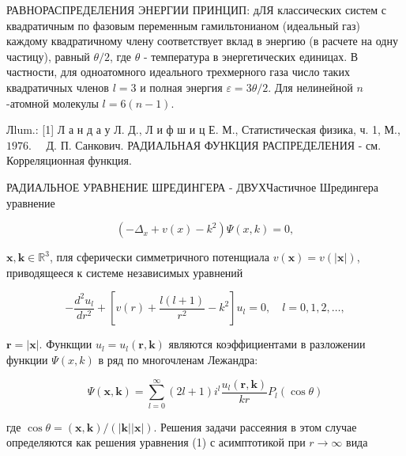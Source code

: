 \documentclass[10pt]{article}
\begin{document}
РАВНОРАСПРЕДЕЛЕНИЯ ЭНЕРГИИ ПРИНЦИП: дЛЯ классических систем с квадратичным по фазовым переменным гамильтонианом (идеальный газ) каждому квадратичному члену соответствует вклад в энергию (в расчете на одну частицу), равный $\theta / 2$, где $\theta$ - температура в энергетических единицах. В частности, для одноатомного идеального трехмерного газа число таких квадратичных членов $l=3$ и полная энергия $\varepsilon=3 \theta / 2$. Для нелинейной $n$-атомной молекулы $l=6(n-1)$.



Лlum.: [1] Л а н д а у Л. Д., Л и ф ш и ц Е. М., Статистическая физика, ч. 1, М., $1976 . \quad$ Д. П. Санкович. РАДИАЛЬНАЯ ФУНКЦИЯ РАСПРЕДЕЛЕНИЯ - см. Корреляционная функция.



РАДИАЛЬНОЕ УРАВНЕНИЕ ШРЕДИНГЕРА - ДВУХЧастичное Шредингера уравнение



\[

\left(-\Delta_{x}+v(x)-k^{2}\right) \Psi(x, k)=0,

\]



$\boldsymbol{x}, \boldsymbol{k} \in \mathbb{R}^{3}$, пля сферически симметричного потенщиала $v(\boldsymbol{x})=v(|\boldsymbol{x}|)$, приводящееся к системе независимых уравнений



\[

-\frac{d^{2} u_{l}}{d r^{2}}+\left[v(r)+\frac{l(l+1)}{r^{2}}-k^{2}\right] u_{l}=0, \quad l=0,1,2, \ldots,

\]



$\boldsymbol{r}=|\boldsymbol{x}|$. Функщии $u_{l}=u_{l}(\boldsymbol{r}, \boldsymbol{k})$ являются коэффициентами в разложении функции $\Psi(x, k)$ в ряд по многочленам Лежандра:



\[

\Psi(\boldsymbol{x}, \boldsymbol{k})=\sum_{l=0}^{\infty}(2 l+1) i^{l} \frac{u_{l}(\boldsymbol{r}, \boldsymbol{k})}{k r} P_{l}(\cos \theta)

\]



где $\cos \theta=(\boldsymbol{x}, \boldsymbol{k}) /(|\boldsymbol{k}||\boldsymbol{x}|)$. Решения задачи рассеяния в этом случае определяются как решения уравнения (1) с асимптотикой при $r \rightarrow \infty$ вида
\end{document}
